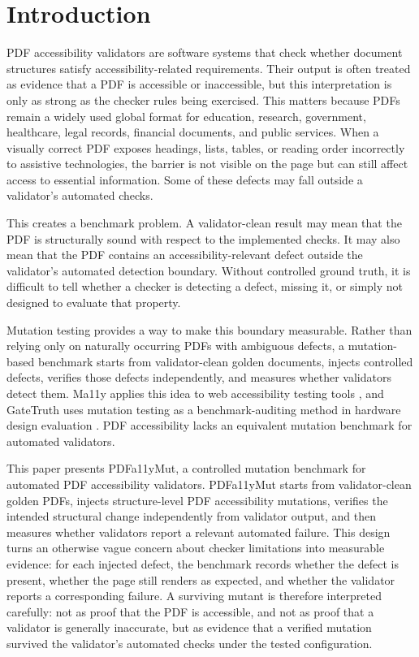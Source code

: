 \documentclass[conference]{IEEEtran}
\begin{document}
\section{Introduction}

PDF accessibility validators are software systems that check whether document structures satisfy accessibility-related requirements. Their output is often treated as evidence that a PDF is accessible or inaccessible, but this interpretation is only as strong as the checker rules being exercised. This matters because PDFs remain a widely used global format for education, research, government, healthcare, legal records, financial documents, and public services. When a visually correct PDF exposes headings, lists, tables, or reading order incorrectly to assistive technologies, the barrier is not visible on the page but can still affect access to essential information. Some of these defects may fall outside a validator's automated checks.

This creates a benchmark problem. A validator-clean result may mean that the PDF is structurally sound with respect to the implemented checks. It may also mean that the PDF contains an accessibility-relevant defect outside the validator's automated detection boundary. Without controlled ground truth, it is difficult to tell whether a checker is detecting a defect, missing it, or simply not designed to evaluate that property.

Mutation testing provides a way to make this boundary measurable. Rather than relying only on naturally occurring PDFs with ambiguous defects, a mutation-based benchmark starts from validator-clean golden documents, injects controlled defects, verifies those defects independently, and measures whether validators detect them. Ma11y applies this idea to web accessibility testing tools \cite{tafreshipour2024ma11y}, and GateTruth uses mutation testing as a benchmark-auditing method in hardware design evaluation \cite{bhadra2026gatetruth}. PDF accessibility lacks an equivalent mutation benchmark for automated validators.

This paper presents PDFa11yMut, a controlled mutation benchmark for automated PDF accessibility validators. PDFa11yMut starts from validator-clean golden PDFs, injects structure-level PDF accessibility mutations, verifies the intended structural change independently from validator output, and then measures whether validators report a relevant automated failure. This design turns an otherwise vague concern about checker limitations into measurable evidence: for each injected defect, the benchmark records whether the defect is present, whether the page still renders as expected, and whether the validator reports a corresponding failure. A surviving mutant is therefore interpreted carefully: not as proof that the PDF is accessible, and not as proof that a validator is generally inaccurate, but as evidence that a verified mutation survived the validator's automated checks under the tested configuration.
\end{document}
